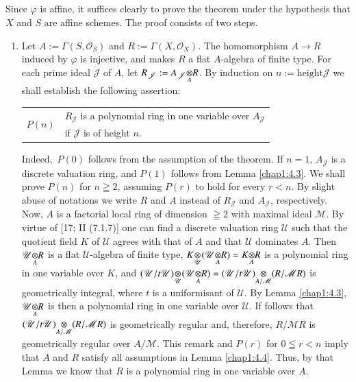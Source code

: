 \subsection{}\label{chap1:4.5}
\begin{proofoftheorem*}[4.1.1 ]
Since $\varphi$ is affine, it suffices clearly to prove the theorem
under the hypothesis that $X$ and $S$ are affine schemes. The proof
consists of two steps.
\begin{enumerate}
\renewcommand{\theenumi}{\Roman{enumi}}
\renewcommand{\labelenumi}{\rm(\theenumi)}
\item Let $A:=\Gamma(S,\mathscr{O}_{S})$ and
  $R:=\Gamma(X,\mathscr{O}_{X})$. The homomorphism $A\to R$ induced by
  $\varphi$ is injective, and makes $R$ a flat $A$-algebra of finite
  type. For each prime ideal $\mathscr{J}$ of $A$, let
  $R_{\mathscr{J}}:=\foprod{A_{\mathscr{J}}}{R}{A}$. By induction on
  $n:=\text{height}\mathscr{J}$ we shall establish the following
  assertion:
\begin{center}
\begin{tabular}{r@{\;:\;}l}
\multirow{2}{*}{$P(n)$} & $R_{\mathscr{J}}$ is a polynomial ring in
one variable over $A_{\mathscr{J}}$\\
 & if $\mathscr{J}$ is of height $n$.
\end{tabular}
\end{center}
Indeed,\pageoriginale\ $P(0)$ follows from the assumption of the
theorem. If $n=1$, $A_{\mathscr{J}}$ is a discrete valuation ring, and
$P(1)$ follows from Lemma \ref{chap1:4.3}. We shall prove $P(n)$ for
$n\geqq 2$, assuming $P(r)$ to hold for every $r<n$. By slight abuse
of notations we write $R$ and $A$ instead of $R_{\mathscr{J}}$ and
$A_{\mathscr{J}}$, respectively. Now, $A$ is a factorial local ring of
dimension $\geqq 2$ with maximal ideal $\mathscr{M}$. By virtue of
[17; II (7.1.7)] one can find a discrete valuation ring $\mathscr{U}$
such that the quotient field $K$ of $\mathscr{U}$ agrees with that of
$A$ and that $\mathscr{U}$ dominates $A$. Then
$\foprod{\mathscr{U}}{R}{A}$ is a flat $\mathscr{U}$-algebra of finite
type,
$\foprod{K}{(\foprod{\mathscr{U}}{R}{A})}{\mathscr{U}}=\foprod{K}{R}{A}$
is a polynomial ring in one variable over $K$, and
$\foprod{(\mathscr{U}/t\mathscr{U})}{(\foprod{\mathscr{U}}{R}{A})}{\mathscr{U}}=\foprod{(\mathscr{U}/t\mathscr{U})}{(R/\mathscr{M}R)}{A/\mathscr{M}}$
is geometrically integral, where $t$ is a uniformisant of
$\mathscr{U}$. By Lemma \ref{chap1:4.3}, $\foprod{\mathscr{U}}{R}{A}$ is
then a polynomial ring in one variable over $\mathscr{U}$. If follows
that
$\foprod{(\mathscr{U}/t\mathscr{U})}{(R/\mathscr{M}R)}{A/\mathscr{M}}$
is  geometrically regular and, therefore, $R/\mathscr{M}R$ is
geometrically regular over $A/\mathscr{M}$. This remark and $P(r)$ for
$0\leqq r<n$ imply that $A$ and $R$ satisfy all assumptions in Lemma
\ref{chap1:4.4}. Thus, by that Lemma we know that $R$ is a polynomial
ring in one variable over $A$.


\end{enumerate}
\end{proofoftheorem*}
